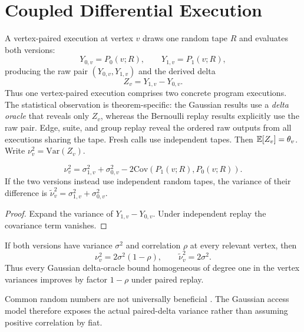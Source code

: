 \section{Coupled Differential Execution}
\label{arch:sec:coupled}

A vertex-paired execution at vertex $v$ draws one random tape $R$ and evaluates both
versions:
\begin{equation}\label{eq:appendix-04-coupled-execution-001}
Y_{0,v}=P_0(v;R),\qquad Y_{1,v}=P_1(v;R),
\end{equation}
producing the raw pair $(Y_{0,v},Y_{1,v})$ and the derived delta
\begin{equation}\label{eq:appendix-04-coupled-execution-002}
Z_v=Y_{1,v}-Y_{0,v}.
\end{equation}
Thus one vertex-paired execution comprises two concrete program executions.
The statistical observation is theorem-specific: the Gaussian results use a
\emph{delta oracle} that reveals only $Z_v$, whereas the Bernoulli replay
results explicitly use the raw pair.  Edge, suite, and group replay reveal the
ordered raw outputs from all executions sharing the tape.  Fresh calls use
independent tapes.  Then $\mathbb{E}[Z_v]=\theta_v$.  Write
$\nu_v^2=\mathrm{Var}(Z_v)$.

\begin{proposition}
\label{arch:prop:diffvar}
\begin{equation}\label{eq:appendix-04-coupled-execution-003}
\nu_v^2
=
\sigma_{1,v}^2+\sigma_{0,v}^2
-2\mathrm{Cov}(P_1(v;R),P_0(v;R)).
\end{equation}
If the two versions instead use independent random tapes, the variance of their
difference is $\widetilde\nu_v^2=\sigma_{1,v}^2+\sigma_{0,v}^2$.
\end{proposition}

\begin{proof}
Expand the variance of $Y_{1,v}-Y_{0,v}$.  Under independent replay the covariance
term vanishes.
\end{proof}

\begin{corollary}
If both versions have variance $\sigma^2$ and correlation $\rho$ at every relevant
vertex, then
\begin{equation}\label{eq:appendix-04-coupled-execution-004}
\nu_v^2=2\sigma^2(1-\rho),
\qquad
\widetilde\nu_v^2=2\sigma^2.
\end{equation}
Thus every Gaussian delta-oracle bound homogeneous of degree one in the vertex
variances improves by factor $1-\rho$ under paired replay.
\end{corollary}

Common random numbers are not universally beneficial \cite{GlassermanYao1992}.
The Gaussian access model therefore exposes the actual paired-delta variance rather than
assuming positive correlation by fiat.
